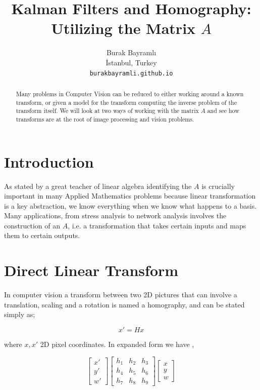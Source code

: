\documentclass{article}
\title{Kalman Filters and Homography: Utilizing the Matrix $A$}
\author{
  Burak Bayramlı \\
  İstanbul, Turkey\\
  \texttt{burakbayramli.github.io} 
}
\begin{document}
\maketitle

\begin{abstract}
Many problems in Computer Vision can be reduced to either working around a known
transform, or given a model for the transform computing the inverse problem of
the transform itself. We will look at two ways of working with the matrix $A$
and see how transforms are at the root of image processing and vision problems.
\end{abstract}



\section{Introduction}

As stated by a great teacher of linear algebra identifying the $A$ is crucially
important in many Applied Mathematics problems \cite{strang} because linear
transformation is a key abstraction, we know everything when we know what
happens to a basis. Many applications, from stress analysis to network analysis
involves the construction of an $A$, i.e. a transformation that takes certain
inputs and maps them to certain outputs.

\section{Direct Linear Transform}

In computer vision a transform between two 2D pictures that can involve a
translation, scaling and a rotation is named a homography, and can be stated
simply as;

$$ x' = H x$$

where $x,x'$ 2D pixel coordinates. In expanded form we have \cite{solem},

$$ 
\left[\begin{array}{r} x' \\ y' \\ w' \end{array}\right]
\left[\begin{array}{rrr}
h_1 & h_2 & h_3 \\
h_4 & h_5 & h_6 \\
h_7 & h_8 & h_9 
\end{array}\right]
\left[\begin{array}{r} x \\ y \\ w \end{array}\right]
$$
\end{document}
